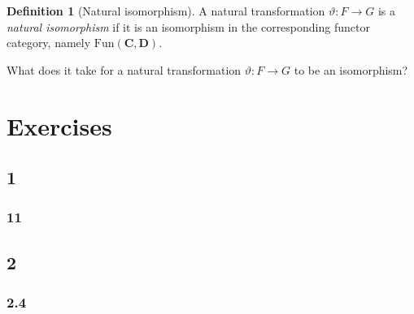 \documentclass{book}
\theoremstyle{definition}
\newtheorem{definition}{Definition}[section]
\newcommand\Fun{\text{Fun}}
\begin{document}
\begin{definition}[Natural isomorphism]
  A natural transformation $\vartheta : F \to G$ is a \emph{natural isomorphism}
  if it is an isomorphism in the corresponding functor category, namely
  $\Fun(\mathbf{C}, \mathbf{D})$.
\end{definition}

What does it take for a natural transformation $\vartheta : F \to G$ to be an
isomorphism?

\chapter{Exercises}

\section{1}

\subsection{11}

\section{2}

\subsection{2.4}
\end{document}
